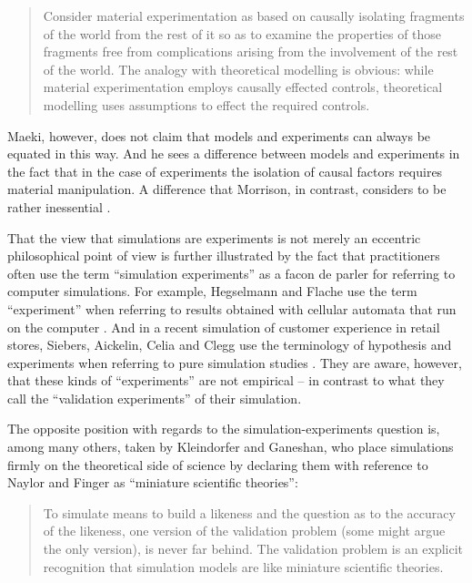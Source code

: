 \documentclass[onecollarge]{STJour}
\numberwithin{equation}{section}
\begin{document}
\begin{quote}

Consider material experimentation as based on causally isolating
fragments of the world from the rest of it so as to examine the
properties of those fragments free from complications arising from the
involvement of the rest of the world. The analogy with theoretical
modelling is obvious: while material experimentation employs causally
effected controls, theoretical modelling uses assumptions to effect the
required controls. \citep[p.\ 308]{maeki:2005}

\end{quote}

Maeki, however, does not claim that models and experiments can always
be equated in this way. And he sees a difference between models and
experiments in the fact that in the case of experiments the isolation
of causal factors requires material manipulation. A difference that
Morrison, in contrast, considers to be rather inessential 
\citep[p.\ 54]{morrison:2009}.

That the view that simulations are experiments is not merely an eccentric
philosophical point of view is further illustrated by the fact that
practitioners often use the term ``simulation experiments'' as a facon
de parler for referring to computer simulations. For example, Hegselmann and
Flache use the term ``experiment'' when referring to results obtained
with cellular automata that run on the computer
\citep[3.11]{hegselmann-flache:1998}. And in a recent simulation
of customer experience in retail stores, Siebers, Aickelin, Celia and
Clegg use the terminology of hypothesis and experiments when referring
to pure simulation studies \citep[p.\ 16ff.]{siebers-et-al:2010}. They are
aware, however, that these kinds of ``experiments'' are not empirical --
in contrast to what they call the ``validation experiments'' of their
simulation.

The opposite position with regards to the simulation-experiments
question is, among many others, taken by Kleindorfer and Ganeshan, who
place simulations firmly on the theoretical side of science by
declaring them with reference to Naylor and Finger
\citep[]{naylor-finger:1967} as ``miniature scientific theories'':

\begin{quote}
To simulate means to build a likeness and the question as to the
accuracy of the likeness, one version of the validation problem (some
might argue the only version), is never far behind. The validation
problem is an explicit recognition that simulation models are like
miniature scientific theories. \citep[p.\ 50]{kleindorfer-ganeshan:1993}
\end{quote}
\end{document}
